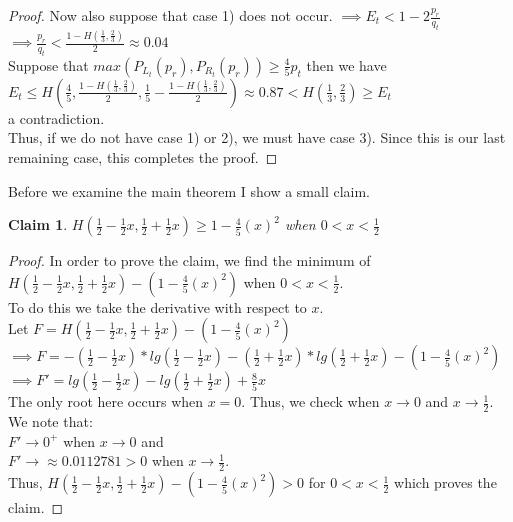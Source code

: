 \documentclass[letterpaper,12pt,titlepage,oneside,final]{book}
\theoremstyle{plain}
\begin{document}
\begin{proof}
Now also suppose that case 1) does not occur. 
$\implies E_t < 1-2\frac{p_r}{q_t}$ \\
$\implies \frac{p_r}{q_t} < \frac{1-H(\frac{1}{3}, \frac{2}{3})}{2} \approx 0.04$ \\
Suppose that $max(P_{L_t}(p_r), P_{R_t}(p_r)) \geq \frac{4}{5} p_t$ then we have \\
$E_t \leq H(\frac{4}{5}, \frac{1-H(\frac{1}{3}, \frac{2}{3})}{2}, \frac{1}{5}-\frac{1-H(\frac{1}{3}, \frac{2}{3})}{2}) \approx 0.87 < H(\frac{1}{3}, \frac{2}{3}) \geq E_t$ \\ 
a contradiction. \\
Thus, if we do not have case 1) or 2), we must have case 3). Since this is our last remaining case, this completes the proof.
 

\end{proof}

Before we examine the main theorem I show a small claim.

\newtheorem{claim}{Claim}
\begin{claim}
$H(\frac{1}{2}-\frac{1}{2} x, \frac{1}{2} + \frac{1}{2} x) \geq 1- \frac{4}{5} (x)^2$ when $0 < x < \frac{1}{2}$
\end{claim}

\begin{proof}
In order to prove the claim, we find the minimum of \\
$H(\frac{1}{2}-\frac{1}{2} x, \frac{1}{2} + \frac{1}{2} x) - (1 - \frac{4}{5} (x)^2)$ when $0 < x < \frac{1}{2}$. \\
To do this we take the derivative with respect to $x$. \\
Let $F= H(\frac{1}{2}-\frac{1}{2} x, \frac{1}{2} + \frac{1}{2} x) - (1 - \frac{4}{5} (x)^2)$ \\
$\implies F = - (\frac{1}{2}-\frac{1}{2} x)* lg(\frac{1}{2}-\frac{1}{2} x) - (\frac{1}{2} + \frac{1}{2} x)*lg(\frac{1}{2} + \frac{1}{2} x) - (1 - \frac{4}{5} (x)^2)$ \\
$\implies F' = lg(\frac{1}{2}-\frac{1}{2} x) - lg(\frac{1}{2} + \frac{1}{2} x) + \frac{8}{5}x$ \\ 
The only root here occurs when $x = 0$. Thus, we check when $x \rightarrow 0$ and $x \rightarrow \frac{1}{2}$. We note that: \\
$F' \rightarrow 0^{+}$ when $x \rightarrow 0$ and \\
$F' \rightarrow \approx 0.0112781 > 0$ when $x \rightarrow \frac{1}{2}$. \\
Thus, $H(\frac{1}{2}-\frac{1}{2} x, \frac{1}{2} + \frac{1}{2} x) - (1 - \frac{4}{5} (x)^2) > 0$ for $ 0 < x < \frac{1}{2}$ which proves the claim.
\end{proof} 
\end{document}
